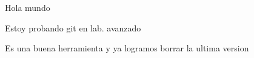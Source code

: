 \documentclass{article}
\begin{document}
Hola mundo

Estoy probando git en lab. avanzado

Es una buena herramienta y ya logramos borrar la ultima version
\end{document}
